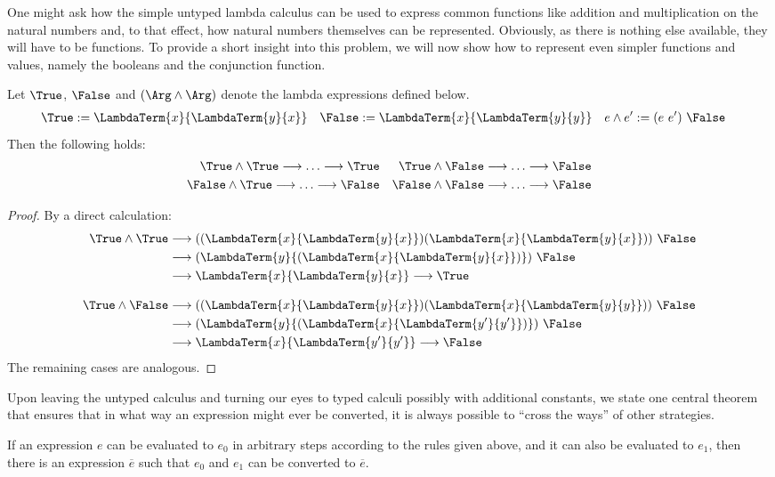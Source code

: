 One might ask how the simple untyped lambda calculus can be used to express
common functions like addition and multiplication on the natural numbers and, to
that effect, how natural numbers themselves can be represented. Obviously, as
there is nothing else available, they will have to be functions. To provide a
short insight into this problem, we will now show how to represent even simpler
functions and values, namely the booleans and the conjunction function.
\begin{lem}
Let $\True$, $\False$ and $(\Arg \land \Arg)$ denote the lambda expressions defined
below.
\begin{align*}
\True &:= \LambdaTerm{x}{\LambdaTerm{y}{x}} & 
\False &:= \LambdaTerm{x}{\LambdaTerm{y}{y}} &
e \land e' &:= (e\ e')\ \False
\end{align*}
Then
the following holds:
\begin{align*}
  \True \land \True \longrightarrow \ldots \longrightarrow \True &&
  \True \land \False \longrightarrow \ldots \longrightarrow \False \\
  \False \land \True \longrightarrow \ldots \longrightarrow \False &&
  \False \land \False \longrightarrow \ldots \longrightarrow \False
\end{align*}
\end{lem}
\begin{proof}
By a direct calculation:
\begin{align*}
  \True \land \True &\longrightarrow 
  ((\LambdaTerm{x}{\LambdaTerm{y}{x}}) (\LambdaTerm{x}{\LambdaTerm{y}{x}}))
  \ \False \\
  &\longrightarrow (\LambdaTerm{y}{(\LambdaTerm{x}{\LambdaTerm{y}{x}})}) \ \False \\
  &\longrightarrow \LambdaTerm{x}{\LambdaTerm{y}{x}} \longrightarrow \True \\[2ex]
  \True \land \False &\longrightarrow
  ((\LambdaTerm{x}{\LambdaTerm{y}{x}}) (\LambdaTerm{x}{\LambdaTerm{y}{y}}))
  \ \False \\ 
  &\longrightarrow (\LambdaTerm{y}{(\LambdaTerm{x}{\LambdaTerm{y'}{y'}})})\ \False \\
  &\longrightarrow \LambdaTerm{x}{\LambdaTerm{y'}{y'}} \longrightarrow \False
\end{align*}
The remaining cases are analogous.
\end{proof}

Upon leaving the untyped calculus and turning our eyes to typed calculi possibly
with additional constants, we state one central theorem that ensures that in
what way an expression might ever be converted, it is always possible to
``cross the ways'' of other strategies.
\begin{prop}
If an expression $e$ can be evaluated to $e_0$ in arbitrary steps according to the
rules given above, and it can also be evaluated to $e_1$, then there is an
expression $\overline{e}$ such that $e_0$ and $e_1$ can be converted to $\overline{e}$.
\end{prop}

